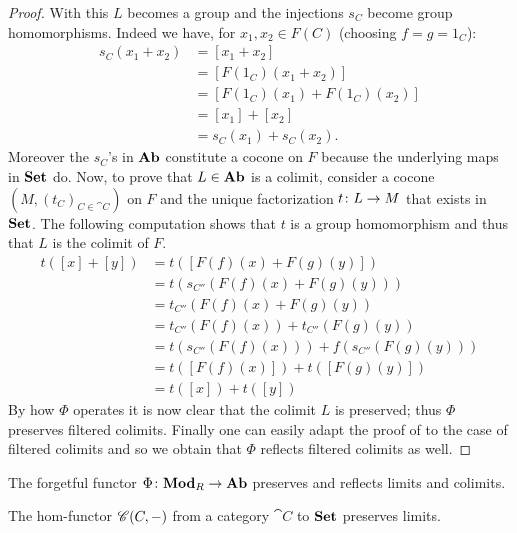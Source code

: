 \begin{proof}
  With this \(L\) becomes a group and the injections \(s_C\) become group homomorphisms. Indeed we have, for \(x_1,x_2\in F(C)\) (choosing \(f = g = 1_C\)):
  \begin{align*}
    s_C(x_1 + x_2) &= [x_1 + x_2]\\
    &= [F(1_C)(x_1 + x_2)]\\
    &= [F(1_C)(x_1) + F(1_C)(x_2)]\\
    &= [x_1] + [x_2]\\
    &= s_C(x_1) + s_C(x_2).
  \end{align*}
  Moreover the \(s_C\)'s in \(\text{\normalfont\textbf{Ab}}\) constitute a cocone on \(F\) because the underlying maps in \(\text{\normalfont\textbf{Set}}\) do. Now, to prove that \(L\in\text{\normalfont\textbf{Ab}}\) is a colimit, consider a cocone \((M, (t_C)_{C\in\cat{C}})\) on \(F\) and the unique factorization \(t\colon L\to M\) that exists in \(\text{\normalfont\textbf{Set}}\). The following computation shows that \(t\) is a group homomorphism and thus that \(L\) is the colimit of \(F\).
  \begin{align*}
    t([x] + [y]) &= t([F(f)(x) + F(g)(y)])\\
    &= t(s_{C''}(F(f)(x) + F(g)(y)))\\
    &= t_{C''}(F(f)(x) + F(g)(y))\\
    &= t_{C''}(F(f)(x)) + t_{C''}(F(g)(y))\\
    &= t(s_{C''}(F(f)(x))) + f(s_{C''}(F(g)(y)))\\
    &= t([F(f)(x)]) + t([F(g)(y)])\\
    &= t([x]) + t([y])
  \end{align*}
  By how \(\Phi\) operates it is now clear that the colimit \(L\) is preserved; thus \(\Phi\) preserves filtered colimits.
  Finally one can easily adapt the proof of \cite[Proposition 2.9.7]{handbook1} to the case of filtered colimits and so we obtain that \(\Phi\) reflects filtered colimits as well.
\end{proof}

\begin{proposition}
  \label{prop:mod_ab_limits_colimits}
  The forgetful functor \(\Phi\colon \text{\normalfont\textbf{Mod}}_R\to \text{\normalfont\textbf{Ab}}\) preserves and reflects limits and colimits.
\end{proposition}

\begin{proposition}
  \label{prop:hom_preserves_limits}
  The hom-functor \({\mathscr C}(C,-)\) from a category \(\cat{C}\) to \(\text{\normalfont\textbf{Set}}\) preserves limits.
\end{proposition}

